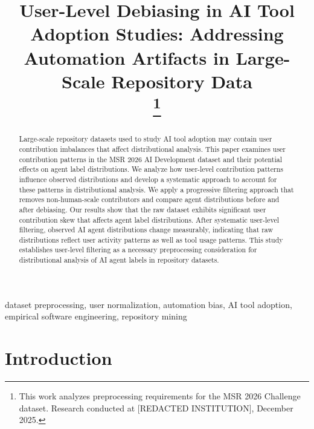 \documentclass[conference]{IEEEtran}
\begin{document}
\title{User-Level Debiasing in AI Tool Adoption Studies: Addressing Automation Artifacts in Large-Scale Repository Data\\
\thanks{This work analyzes preprocessing requirements for the MSR 2026 Challenge dataset. Research conducted at [REDACTED INSTITUTION], December 2025.}
}

\author{
}

\maketitle

\begin{abstract}
Large-scale repository datasets used to study AI tool adoption may contain user contribution imbalances that affect distributional analysis. This paper examines user contribution patterns in the MSR 2026 AI Development dataset and their potential effects on agent label distributions. We analyze how user-level contribution patterns influence observed distributions and develop a systematic approach to account for these patterns in distributional analysis. We apply a progressive filtering approach that removes non-human-scale contributors and compare agent distributions before and after debiasing. Our results show that the raw dataset exhibits significant user contribution skew that affects agent label distributions. After systematic user-level filtering, observed AI agent distributions change measurably, indicating that raw distributions reflect user activity patterns as well as tool usage patterns. This study establishes user-level filtering as a necessary preprocessing consideration for distributional analysis of AI agent labels in repository datasets.
\end{abstract}

\begin{IEEEkeywords}
dataset preprocessing, user normalization, automation bias, AI tool adoption, empirical software engineering, repository mining
\end{IEEEkeywords}

\section{Introduction}
\end{document}
